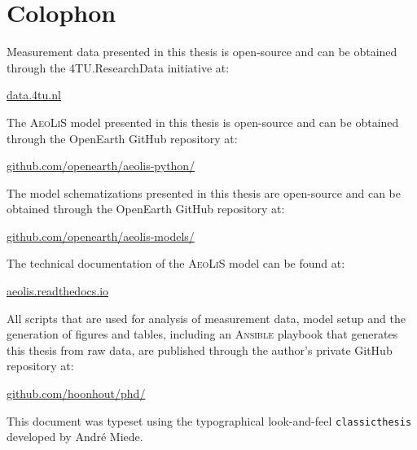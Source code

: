 \pagestyle{empty}

\hfill

\vfill

\section*{Colophon}

Measurement data presented in this thesis is open-source and can be
obtained through the 4TU.ResearchData initiative at:

\href{http://data.4tu.nl}{data.4tu.nl}

\noindent The \textsc{AeoLiS} model presented in this thesis is
open-source and can be obtained through the OpenEarth GitHub
repository at:

\href{http://www.github.com/openearth/aeolis-python/}{github.com/openearth/aeolis-python/}

\noindent The model schematizations presented in this thesis are
open-source and can be obtained through the OpenEarth GitHub
repository at:

\href{http://www.github.com/openearth/aeolis-models/}{github.com/openearth/aeolis-models/}

\noindent The technical documentation of the \textsc{AeoLiS} model can
be found at:

\href{http://aeolis.readthedocs.io/}{aeolis.readthedocs.io}

\noindent All scripts that are used for analysis of measurement data,
model setup and the generation of figures and tables, including an
\textsc{Ansible} playbook that generates this thesis from raw data,
are published through the author's private GitHub repository at:

\href{http://www.github.com/hoonhout/phd/}{github.com/hoonhout/phd/}

\bigskip

\noindent This document was typeset using the typographical look-and-feel
\texttt{classicthesis} developed by Andr\'e Miede.
 


